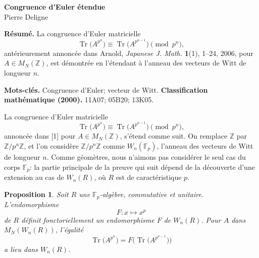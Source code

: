 \documentclass[10pt,a4paper]{article}
\newcommand{\Z}{\mathbb Z}
\newcommand{\F}{\mathbb F}
\newcommand{\Tr}{\operatorname{Tr}}
\newcommand{\MN}{M_N}
\newcommand{\Wn}{W_n}
\theoremstyle{deligne}
\newtheorem*{proposition*}{Proposition}
\begin{document}
\begin{center}
{\Large\bfseries Congruence d'Euler étendue}\\[0.6em]
{\large Pierre Deligne}
\end{center}

\textbf{Résumé.} La congruence d'Euler matricielle
\[
\Tr\bigl(A^{p^n}\bigr)\equiv \Tr\bigl(A^{p^{n-1}}\bigr)\pmod{p^n},
\]
antérieurement annoncée dans Arnold, \textit{Japanese J. Math.} \textbf{1}(1), 1--24, 2006, pour \(A\in \MN(\Z)\), est démontrée en l'étendant à l'anneau des vecteurs de Witt de longueur \(n\).

\textbf{Mots-clés.} Congruence d'Euler; vecteur de Witt.\quad
\textbf{Classification mathématique (2000).} 11A07; 05B20; 13K05.

La congruence d'Euler matricielle
\begin{equation}
\tag{1}
\Tr\bigl(A^{p^n}\bigr)\equiv \Tr\bigl(A^{p^{n-1}}\bigr)\pmod{p^n},
\end{equation}
annoncée dans [1] pour \(A\in \MN(\Z)\), s'étend comme suit. On remplace \(\Z\) par \(\Z/p^n\Z\), et l'on considère \(\Z/p^n\Z\) comme \(\Wn(\F_p)\), l'anneau des vecteurs de Witt de longueur \(n\). Comme géomètres, nous n'aimons pas considérer le seul cas du corps \(\F_p\): la partie principale de la preuve qui suit dépend de la découverte d'une extension au cas de \(\Wn(R)\), où \(R\) est de caractéristique \(p\).

\begin{proposition*}
Soit \(R\) une \(\F_p\)-algèbre, commutative et unitaire. L'endomorphisme
\[
F:x\longmapsto x^p
\]
de \(R\) définit fonctoriellement un endomorphisme \(F\) de \(\Wn(R)\). Pour \(A\) dans \(\MN(\Wn(R))\), l'égalité
\begin{equation}
\tag{2}
\Tr\bigl(A^{p^n}\bigr)=F\bigl(\Tr\bigl(A^{p^{n-1}}\bigr)\bigr)
\end{equation}
a lieu dans \(\Wn(R)\).
\end{proposition*}
\end{document}
